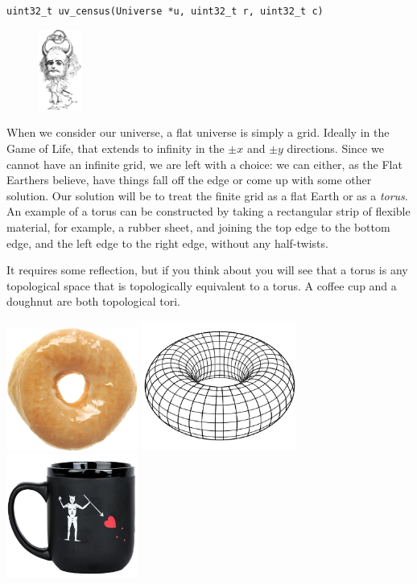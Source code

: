 \begin{funcdoc}{\texttt{uint32\_t uv\_census(Universe *u, uint32\_t r, uint32\_t c)}}
  \begin{figure}
    \includegraphics[width=0.125\textwidth]{images/horns.jpg}
  \end{figure}

  When we consider our universe, a flat universe is simply a grid.  Ideally in
  the Game of Life, that extends to infinity in the $\pm x$ and $\pm y$
  directions. Since we cannot have an infinite grid, we are left with a choice:
  we can either, as the Flat Earthers believe, have things fall off the edge or
  come up with some other solution. Our solution will be to treat the finite
  grid as a flat Earth or as a \emph{torus}. An example of a torus can be
  constructed by taking a rectangular strip of flexible material, for example, a
  rubber sheet, and joining the top edge to the bottom edge, and the left edge
  to the right edge, without any half-twists.

  It requires some reflection, but if you think about you will see that a torus
  is any topological space that is topologically equivalent to a torus. A coffee
  cup and a doughnut are both topological tori.

  \begin{center}
    \includegraphics[width=1.7in]{images/donut.png}\hfil
    \includegraphics[width=2in]{images/torus.png}\hfil
    \includegraphics[width=1.7in]{images/cup.png}
  \end{center}


\end{funcdoc}

